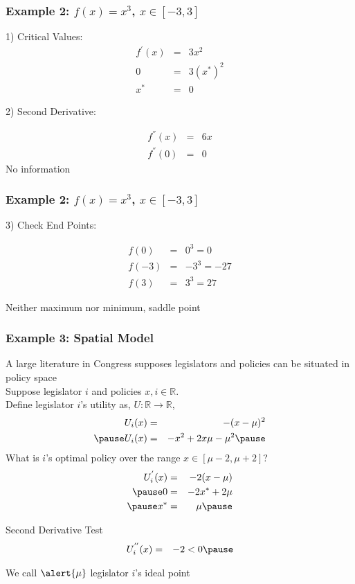 \documentclass[aspectratio=169, handout]{beamer}
\numberwithin{equation}{section}
\begin{document}
\begin{frame}
\frametitle{Example 2: $f(x) = x^3$, $x \in [-3, 3] $ }

1) Critical Values: 
\begin{eqnarray}
f^{'}(x) & = & 3x^2 \nonumber \\
0 & = & 3 (x^{*})^{2} \nonumber \\
x^{*} & = & 0 \nonumber 
\end{eqnarray} \pause

2) Second Derivative: 

\begin{eqnarray}
f^{''}(x) & = & 6 x \nonumber \\
f^{''}(0) & = &  0 \nonumber 
\end{eqnarray}
\alert{No information}

\end{frame}



\begin{frame}
\frametitle{Example 2: $f(x) = x^3$, $x \in [-3, 3] $}


3) Check End Points: 

\begin{eqnarray}
f(0) & = & 0^3  = 0 \nonumber \\
f(-3) & = & -3^3 = -27 \nonumber \\
f(3) & = & 3^3 = 27 \nonumber 
\end{eqnarray}

Neither maximum nor minimum, \alert{saddle point} 

\end{frame}



\begin{frame}
\frametitle{Example 3: Spatial Model}
A large literature in Congress supposes legislators and policies can be situated in \alert{policy space} \pause \\

Suppose legislator $i$ and policies $x, i \in \mathbb{R}$. \pause  \\
Define legislator $i$'s utility as, $U:\mathbb{R} \rightarrow \mathbb{R}$, \pause 
\begin{eqnarray}
U_{i} (x) & = & - (x - \mu)^{2}  \nonumber \\ \pause 
U_{i}(x) & = & - x^2 +  2 x \mu  - \mu^2 \nonumber \pause 
\end{eqnarray}
What is $i$'s optimal policy over the range $x \in [\mu- 2, \mu + 2]$? \pause 
\begin{eqnarray}
U_{i}^{'} (x) & = & -2 (x - \mu) \nonumber \\ \pause 
0 & = & -2x^{*} + 2 \mu \nonumber \\ \pause 
x^{*} & = & \mu \nonumber \pause 
\end{eqnarray}

\alert{Second Derivative Test} \pause 
\begin{eqnarray}
U^{''}_{i}(x)  & = & -2 <0  \nonumber \pause 
\end{eqnarray}

We call $\alert{\mu}$ legislator $i$'s \alert{ideal point} 

\end{frame} 
\end{document}
